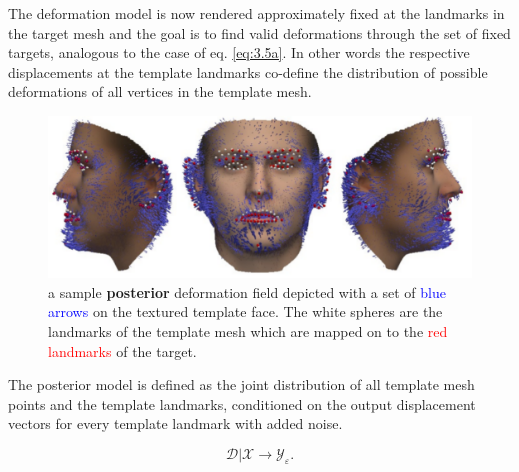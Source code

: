 The deformation model is now rendered approximately fixed at the landmarks in the target mesh and the goal is to find valid deformations through the set of fixed targets, analogous to the case of eq. \ref{eq:3.5a}. In other words the respective displacements at the template landmarks co-define the distribution of possible deformations of all vertices in the template mesh.
\begin{figure}[h!]
    \includegraphics[width=\textwidth]{./resources/img/posterior_deformations.pdf}
    \caption{a sample \textbf{posterior} deformation field depicted with a set of \textcolor{blue}{blue arrows} on the textured template face. The white spheres are the landmarks of the template mesh which are mapped on to the \textcolor{red}{red landmarks} of the target.}
\label{fig:posteriordeformations}
\end{figure}
The posterior model is defined as the joint distribution of all template mesh points and the
template landmarks, conditioned on the output displacement vectors for every template landmark with added noise. 
\begin{center}
\begin{equation}
    \mathcal{D}\vert \mathcal{X} \rightarrow \mathcal{Y}_{\varepsilon}. 
\end{equation}
\end{center}
